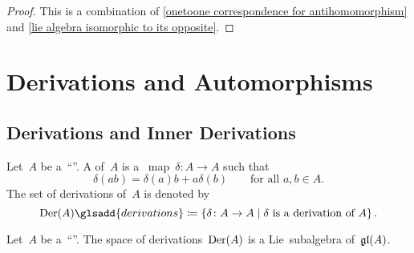 \begin{proof}
  This is a combination of \cref{onetoone correspondence for antihomomorphism} and \cref{lie algebra isomorphic to its opposite}.
\end{proof}





\section{Derivations and Automorphisms}



\subsection{Derivations and Inner Derivations}


\begin{definition}
  \label{definition of derivations}
  Let~$A$ be a~\enquote{\algebra{$\kf$}}.
  A  of~$A$ is a~{\linear{$\kf$}} map~$\delta \colon A \to A$ such that
  \[
    \delta(ab)
    =
    \delta(a) b + a \delta(b)
    \qquad
    \text{for all~$a, b \in A$.}
  \]
  The set of derivations of~$A$ is denoted by
  \[
    \Der(A)\glsadd{derivations}
    \defined
    \{
      \delta
      \colon
      A
      \textstyle\to
      A
    \suchthat
      \text{$\delta$ is a derivation of~$A$}
    \}  \,.
  \]
\end{definition}


\begin{proposition}
  Let~$A$ be a~\enquote{\algebra{$\kf$}}.
  The space of derivations~$\operatorname{Der}(A)$ is a Lie~subalgebra of~$\mathfrak{gl}(A)$.
\end{proposition}


